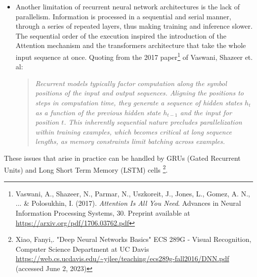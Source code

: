 \documentclass{article}
\begin{document}
\begin{itemize}
\begin{itemize}
	    \item Another limitation of recurrent neural network architectures is the lack of parallelism. Information is processed in a sequential and serial manner, through a series of repeated layers, thus making training and inference slower. The sequential order of the execution inspired the introduction of the Attention mechanism and the transformers architecture that take the whole input sequence at once. Quoting from the 2017 paper\footnote{Vaswani, A., Shazeer, N., Parmar, N., Uszkoreit, J., Jones, L., Gomez, A. N., ... \& Polosukhin, I. (2017). \textit{Attention Is All You Need}. Advances in Neural Information Processing Systems, 30. Preprint available at \url{https://arxiv.org/pdf/1706.03762.pdf}} of Vaswani, Shazeer et. al: \\
	    
	    \begin{quote}
	    \textit{
	    	Recurrent models typically factor computation along the symbol positions of the input and output sequences. Aligning the positions to steps in computation time, they generate a sequence of hidden states $h_t$ as a function of the previous hidden state $h_{t-1}$ and the input for position $t$. This inherently sequential nature precludes parallelization within training examples, which becomes critical at long sequence lengths, as memory constraints limit batching across examples.
	    }
	    \end{quote}
	
	\end{itemize}

	These issues that arise in practice can be handled by GRUs (Gated Recurrent Units) and Long Short Term Memory (LSTM) cells \footnote{Xiao, Fanyi,. "Deep Neural Networks Basics" ECS 289G - Visual Recognition, Computer Science Department at UC Davis \url{https://web.cs.ucdavis.edu/~yjlee/teaching/ecs289g-fall2016/DNN.pdf} (accessed June 2, 2023)}.
	

\end{itemize}
\end{document}
